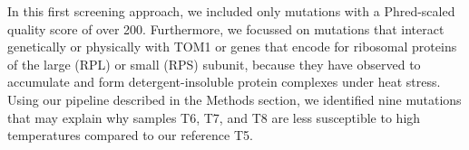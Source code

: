 \documentclass[10pt,a4paper]{article}
\begin{document}
\noindent In this first screening approach, we included only mutations with a Phred-scaled quality score of over 200. Furthermore, we focussed on mutations that interact genetically or physically with TOM1 or genes that encode for ribosomal proteins of the large (RPL) or small (RPS) subunit, because they have observed to accumulate and form detergent-insoluble protein complexes under heat stress. Using our pipeline described in the Methods section, we identified nine mutations that may explain why samples T6, T7, and T8 are less susceptible to high temperatures compared to our reference T5.


\begin{table}[]
	\tiny
	\centering
\end{table}
\end{document}
